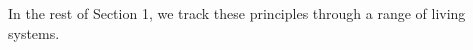 \documentclass[12pt]{article}
\begin{document}
In the rest of Section 1, we track these principles through a range of living systems.















\end{document}

